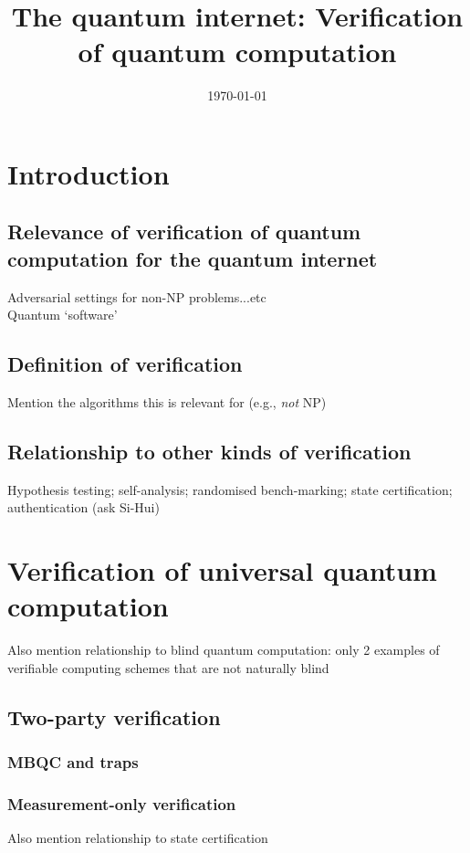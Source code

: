 \documentclass[pra,onecolumn,preprintnumbers,superscriptaddress]{revtex4}
\begin{document}
\title{The quantum internet: Verification of quantum computation}

\date{\today}

\begin{abstract}

\end{abstract}
\maketitle 
\section{Introduction}
\subsection{Relevance of verification of quantum computation for the quantum internet} 
Adversarial settings for non-NP problems...etc \\

Quantum `software' 

\subsection{Definition of verification} 
Mention the algorithms this is relevant for (e.g., \textit{not} NP) 
\subsection{Relationship to other kinds of verification}
Hypothesis testing; self-analysis; randomised bench-marking; state certification; authentication (ask Si-Hui) 
\section{Verification of universal quantum computation} 
Also mention relationship to blind quantum computation: only 2 examples of verifiable computing schemes that are not naturally blind 
\subsection{Two-party verification}
\subsubsection{MBQC and traps}
\subsubsection{Measurement-only verification}
Also mention relationship to state certification 
\end{document}
